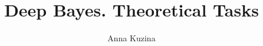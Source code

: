 \documentclass[]{article}
\title{Deep Bayes. Theoretical Tasks}
\author{Anna Kuzina}
\begin{document}
\maketitle

\begin{abstract}

\end{abstract}

\section{}
\end{document}
